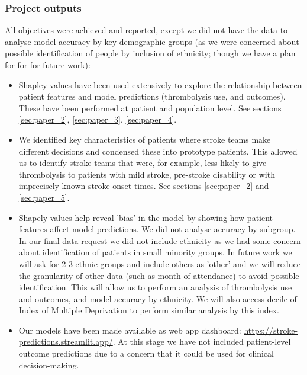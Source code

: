 \subsubsection*{Project outputs}

All objectives were achieved and reported, except we did not have the data to analyse model accuracy by key demographic groups (as we were concerned about possible identification of people by inclusion of ethnicity; though we have a plan for for for future work):

\begin{itemize}
    \item Shapley values have been used extensively to explore the relationship between patient features and model predictions (thrombolysis use, and outcomes). These have been performed at patient and population level. See sections \ref{sec:paper_2}, \ref{sec:paper_3}, \ref{sec:paper_4}.
    \item We identified key characteristics of patients where stroke teams make different decisions and condensed these into prototype patients. This allowed us to identify stroke teams that were, for example, less likely to give thrombolysis to patients with mild stroke, pre-stroke disability or with imprecisely known stroke onset times. See sections \ref{sec:paper_2} and \ref{sec:paper_5}.
    \item Shapely values help reveal 'bias' in the model by showing how patient features affect model predictions. We did not analyse accuracy by subgroup. In our final data request we did not include ethnicity as we had some concern about identification of patients in small minority groups. In future work we will ask for 2-3 ethnic groups and include others as 'other' and we will reduce the granularity of other data (such as month of attendance) to avoid possible identification. This will allow us to perform an analysis of thrombolysis use and outcomes, and model accuracy by ethnicity. We will also access decile of Index of Multiple Deprivation to perform similar analysis by this index.
    \item Our models have been made available as web app dashboard: \url{https://stroke-predictions.streamlit.app/}. At this stage we have not included patient-level outcome predictions due to a concern that it could be used for clinical decision-making. 
\end{itemize}




